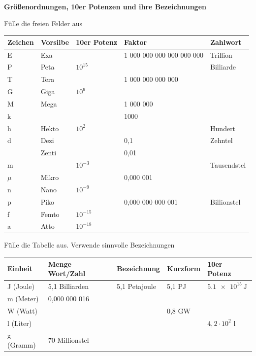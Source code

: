 \documentclass[a4paper]{article}
\begin{document}
{\bf Größenordnungen, 10er Potenzen und ihre Bezeichnungen}
\begin{enumerate}[1.]
{\bf \item Fülle die freien Felder aus}

\renewcommand{\arraystretch}{2.2}
\begin{tabular}{|p{2 cm}|p{2 cm}|p{2 cm}|p{4.5 cm}|p{4.5 cm}|}
	\hline
	Zeichen & Vorsilbe & 10er Potenz & Faktor & Zahlwort\\
	\hline
	E & Exa  &  &   1 000 000 000 000 000 000 & Trillion\\
	\hline
	P & Peta & $10^{15}$  &  & Billiarde \\
	\hline
	T & Tera &  &  1 000 000 000 000 & \\
	\hline
	G & Giga & $10^9$ &   &   \\
	\hline
	M & Mega &  &   1 000 000  & \\
	\hline
	k &      &  &   1000 & \\
	\hline
	h & Hekto & $10^2$ &  & Hundert \\
	\hline
	d & Dezi &  & 0,1 & Zehntel \\
	\hline
	  & Zenti & & 0,01 & \\
	\hline  
	m &      & $10^{-3}$ & & Tausendstel\\ 
	\hline
$\mu$ & Mikro &  & 0,000 001 & \\
    \hline
    n & Nano & $10^{-9}$ & & \\
    \hline
    p & Piko &   & 0,000 000 000 001 & Billionstel\\
    \hline
    f & Femto & $10^{-15}$&  & \\
    \hline
    a & Atto & $10^{-18}$ &  & \\
    \hline
\end{tabular}

{\bf \item Fülle die Tabelle aus. Verwende sinnvolle Bezeichnungen }

\renewcommand{\arraystretch}{2.2}
\begin{tabular}{|p{3 cm}|p{3 cm}|p{3 cm}|p{3 cm}|p{3 cm}|}
	\hline
Einheit & Menge Wort/Zahl & Bezeichnung & Kurzform & 10er Potenz \\
\hline
J (Joule)   & 5,1 Billiarden & 5,1 Petajoule & 5,1 PJ & $\SI{5,1e15}{\joule}$ \\
\hline
m (Meter)   & 0,000 000 016  & & & \\
\hline 
W (Watt)   & & & 0,8 GW & \\
\hline
l (Liter) &  & & & $4,2 \cdot 10^2 $ l \\ 
\hline
g (Gramm) & 70 Millionstel & & & \\
\hline
\end{tabular}



\end{enumerate} 
\end{document}
